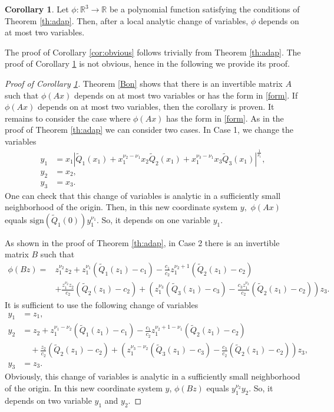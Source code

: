 \documentclass[a4paper, 11pt]{article}
\theoremstyle{plain}
\theoremstyle{definition}
\theoremstyle{lemma}
\theoremstyle{Remark}
\theoremstyle{proposition}
\theoremstyle{corollary}
\newtheorem{corollary}[theorem]{Corollary}
\theoremstyle{example}
\theoremstyle{assumption}
\begin{document}
\begin{corollary}\label{esseen}
Let  $\phi:\mathbb{R}^3\to \mathbb{R}$ be a  polynomial function  satisfying the conditions of Theorem   \ref{th:adap}.  Then, after  a
local analytic  change of variables,   $\phi$ depends on at most two variables.
\end{corollary}
The proof of Corollary \ref{cor:obvious}  follows trivially from Theorem \ref{th:adap}.  The proof of Corollary \ref{esseen} is not obvious, hence in the following we provide its proof.
\begin{proof}[{Proof of Corollary \ref{esseen}}] Theorem \ref{Bon} shows that there is an invertible matrix $A$ such that $\phi(Ax)$ depends on at most two variables or has the form in \eqref{form}. If $\phi(Ax)$ depends on at most two variables, then the corollary is proven. It remains  to consider the case  where  $\phi(Ax)$ has the form in  \eqref{form}. As in the proof of Theorem \ref{th:adap} we can consider two cases. In Case 1, we  change the variables
\begin{align*}
y_1&=x_1|\tilde Q_1(x_1)+x_1^{\nu_2-\nu_1}x_2 \tilde{Q}_2(x_1)+x_1^{\nu_3-\nu_1}x_3\tilde{Q}_3(x_1)|^\frac1{\nu_1},\\
y_2&=x_2,\\
y_3&=x_3.
\end{align*}
One can check that this change of variables is analytic in a sufficiently small neighborhood of the origin.
 Then, in this new coordinate system $y,$ $\phi(Ax)$ equals $\mathrm{sign}(\tilde Q_1(0))y_1^{\nu_1}.$ So, it depends on one variable $y_1$.


As shown in the proof of Theorem \ref{th:adap}, in Case 2 there is an invertible matrix $B$ such that
\begin{align*}
\phi(Bz)=&z_1^{\nu_2}z_2+z_1^{\nu_1}(\tilde Q_1(z_1)-c_1)-\frac{c_1}{c_2}z_1^{\nu_2+1}(\tilde Q_2(z_1)-c_2)\\ &+\frac{z_1^{\nu_2}z_2}{c_2}(\tilde Q_2(z_1)-c_2)+\left(z_1^{\nu_3}(\tilde Q_3(z_1)-c_3)-\frac{c_3z_1^{\nu_2} }{c_2}(\tilde Q_2(z_1)-c_2)\right)z_3.
\end{align*}
 It is sufficient to use the following change of variables
 \begin{align*}
 y_1&=z_1,\\
  y_2&= z_2+z_1^{\nu_1-\nu_2}(\tilde Q_1(z_1)-c_1)-\frac{c_1}{c_2}z_1^{\nu_2+1-\nu_1}(\tilde Q_2(z_1)-c_2) \\ &\quad +\frac{z_2}{c_2}(\tilde Q_2(z_1)-c_2)+\left(z_1^{\nu_3-\nu_2}(\tilde Q_3(z_1)-c_3)-\frac{c_3 }{c_2}(\tilde Q_2(z_1)-c_2)\right)z_3,\\
  y_3&=z_3.
 \end{align*}
Obviously, this change of variables is  analytic  in a sufficiently small neighborhood of the origin. In this new coordinate system $y$, $\phi(Bz)$ equals $ y_1^{\nu_2} y_2.$
So, it depends on two variable $y_1$ and $y_2$.


  \end{proof}
\end{document}
